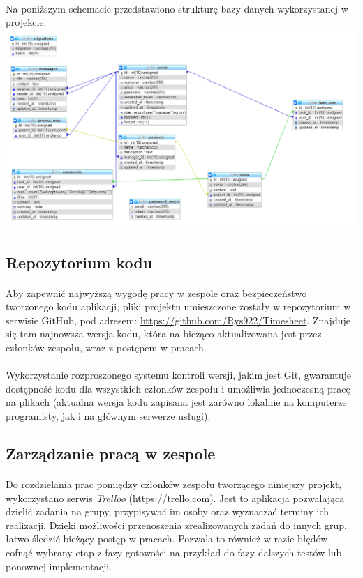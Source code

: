 \documentclass[a4paper, 12pt, oneside]{article}
\begin{document}
			\paragraph{}Na poniższym schemacie przedstawiono strukturę bazy danych wykorzystanej w projekcie:\\
			\linebreak
			\includegraphics[width=17cm]{baza.png}
		\subsection{Repozytorium kodu}
			\paragraph{}Aby zapewnić najwyższą wygodę pracy w zespole oraz bezpieczeństwo tworzonego kodu aplikacji, pliki projektu umieszczone zostały w repozytorium w serwisie GitHub, pod adresem:  \url{https://github.com/Rys922/Timesheet}. Znajduje się tam najnowsza wersja kodu, która na bieżąco aktualizowana jest przez członków zespołu, wraz z postępem w pracach.
			\paragraph{} Wykorzystanie rozproszonego systemu kontroli wersji, jakim jest Git, gwarantuje dostępność kodu dla wszystkich członków zespołu i umożliwia jednoczesną pracę na plikach (aktualna wersja kodu zapisana jest zarówno lokalnie na komputerze programisty, jak i na głównym serwerze usługi).
			\subsection{Zarządzanie pracą w zespole}
			\paragraph{}Do rozdzielania prac pomiędzy członków zespołu tworzącego niniejszy projekt, wykorzystano serwis \textit{Trelloo} (\url{https://trello.com}). Jest to aplikacja pozwalająca dzielić zadania na grupy, przypisywać im osoby oraz wyznaczać terminy ich realizacji. Dzięki możliwości przenoszenia zrealizowanych zadań do innych grup, łatwo śledzić bieżący postęp w pracach. Pozwala to również w razie błędów cofnąć wybrany etap z fazy gotowości na przykład do fazy dalszych testów lub ponownej implementacji. 
\end{document}
